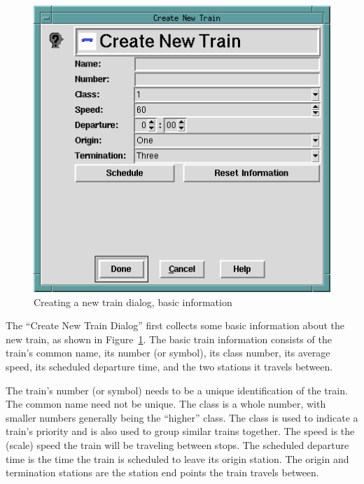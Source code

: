\begin{figure}[hbpt]
\begin{centering}   
\includegraphics{TTCreateNewTrain1.png}
\caption{Creating a new train dialog, basic information}
\label{fig:tt:CreateNewTrain1}
\end{centering}
\end{figure}
The ``Create New Train Dialog'' first collects some basic information
about the new train, as shown in Figure~\ref{fig:tt:CreateNewTrain1}.
The basic train information consists of the train's common name, its
number (or symbol), its class number, its average speed, its scheduled
departure time, and the two stations it travels between.

The train's number (or symbol) needs to be a unique identification of
the train.  The common name need not be unique.  The class is a whole
number, with smaller numbers generally being the ``higher'' class. The
class is used to indicate a train's priority and is also used to group
similar trains together.  The speed is the (scale) speed the train will
be traveling between stops.  The scheduled departure time is the time
the train is scheduled to leave its origin station.  The origin and
termination stations are the station end points the train travels between.


